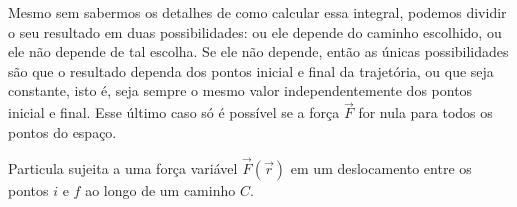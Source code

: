 Mesmo sem sabermos os detalhes de como calcular essa integral, podemos dividir o seu resultado em duas possibilidades: ou ele depende do caminho escolhido, ou ele não depende de tal escolha. Se ele não depende, então as únicas possibilidades são que o resultado dependa dos pontos inicial e final da trajetória, ou que seja constante, isto é, seja sempre o mesmo valor independentemente dos pontos inicial e final. Esse último caso só é possível se a força $\vec{F}$ for nula para todos os pontos do espaço.

\begin{marginfigure}
\centering
{}
\caption{Particula sujeita a uma força variável $\vec{F}(\vec{r})$ em um deslocamento entre os pontos $i$ e $f$ ao longo de um caminho $C$.\label{Fig:PartMovPot}}
\end{marginfigure}


